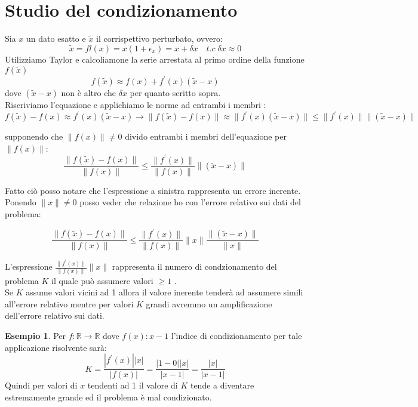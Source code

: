 \documentclass[12pt, a4paper]{book}
\theoremstyle{definition}
\newtheorem{exmp}{Esempio}[section]
\begin{document}
\section{Studio del condizionamento}
\begin{flushleft}
Sia $x$ un dato esatto e $\tilde{x}$ il corrispettivo perturbato, ovvero: 
\[ \tilde{x} = fl(x) = x(1+\epsilon_{x}) = x + \delta x  \quad t.c \; \delta x \approx 0\]
Utilizziamo Taylor e calcoliamone la serie arrestata al primo ordine della funzione $f(\tilde{x})$
\[f(\tilde{x}) \approx f(x) + f^{'}(x)(\tilde{x} - x) \]
dove $(\tilde{x} - x)$ non è altro che $\delta x$ per quanto scritto sopra.\\

Riscriviamo l'equazione e applichiamo le norme ad entrambi i membri : 
\[
		f(\tilde{x}) - f(x)  \approx   f^{'}(x)(\tilde{x} - x) \rightarrow \lVert f(\tilde{x})-f(x)\rVert\approx\lVert f^{'}(x)(\tilde{x} - x)\rVert\leq\lVert f^{'}(x)\rVert \lVert(\tilde{x} - x)\rVert 
\]

supponendo che $\lVert f(x) \rVert \neq 0$ divido entrambi i membri dell'equazione per $\lVert f(x) \rVert$:
\[ 
	\frac{\lVert f(\tilde{x})-f(x)\rVert}{\lVert f(x) \rVert} \leq \frac{\lVert f^{'}(x)\rVert}{\lVert f(x) \rVert } \lVert(\tilde{x} - x)\rVert 
\]

Fatto ciò posso notare che l'espressione a sinistra rappresenta un errore inerente.  Ponendo  $\lVert x \rVert \neq 0$ posso veder che relazione ho con l'errore relativo sui dati del problema:

\[ 
	\frac{\lVert f(\tilde{x})-f(x)\rVert}{\lVert f(x) \rVert} \leq 
	\frac{\lVert f^{'}(x)\rVert}{\lVert f(x)\rVert }\lVert x\rVert \frac{\lVert(\tilde{x} - x)\rVert }{\lVert x\rVert}
\]

L'espressione $\frac{\lVert f^{'}(x)\rVert}{\lVert f(x)\rVert }\lVert x\rVert$ rappresenta il numero di condzionamento del problema $K$ il quale può assumere valori $\geq 1$ .  \\
Se $K$ assume valori vicini ad 1 allora il valore inerente tenderà ad assumere simili all'errore relativo mentre per valori $K$ grandi avremmo un amplificazione dell'errore relativo sui dati.

\begin{exmp}
Per $f: \mathbb{R} \rightarrow \mathbb{R}$ dove $f(x) : x-1$ l'indice di condizionamento per tale applicazione risolvente sarà: 
\[ K = \frac{|f^{'}(x)| |x|}{|f(x)|} = \frac{|1-0||x|}{|x-1|} = \frac{|x|}{|x-1|} \]
Quindi per valori di $x$ tendenti ad 1 il valore di $K$ tende a diventare estremamente grande ed il problema è mal condizionato.
\end{exmp}



\end{flushleft}
\end{document}
